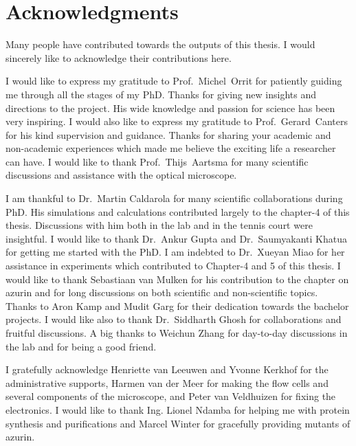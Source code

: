 \chapter*{Acknowledgments}
\label{ch:Acknowledgments}

Many people have contributed towards the outputs of this thesis.
I would sincerely like to acknowledge their contributions here.

I would like to express my gratitude to Prof.~Michel~Orrit for patiently guiding me through all the stages of my PhD.
Thanks for giving new insights and directions to the project.
His wide knowledge and passion for science has been very inspiring.
I would also like to express my gratitude to Prof.~Gerard~Canters for his kind supervision and guidance.
Thanks for sharing your academic and non-academic experiences which made me believe the exciting life a researcher can have.
I would like to thank Prof.~Thijs~Aartsma for many scientific discussions and assistance with the optical microscope.

I am thankful to Dr.~Martin Caldarola for many scientific collaborations during PhD.
His simulations and calculations contributed largely to the chapter-4 of this thesis.
Discussions with him both in the lab and in the tennis court were insightful.
I would like to thank Dr.~Ankur Gupta and Dr.~Saumyakanti Khatua for getting me started with the PhD.
I am indebted to Dr.~Xueyan Miao for her assistance in experiments which contributed to Chapter-4 and 5 of this thesis.
I would like to thank Sebastiaan van Mulken for his contribution to the chapter on azurin and for long discussions on both scientific and non-scientific topics.
Thanks to Aron Kamp and Mudit Garg for their dedication towards the bachelor projects.
I would like also to thank Dr.~Siddharth Ghosh for collaborations and fruitful discussions.
A big thanks to Weichun Zhang for day-to-day discussions in the lab and for being a good friend. 

I gratefully acknowledge Henriette van Leeuwen and Yvonne Kerkhof for the administrative supports, Harmen van der Meer for making the flow cells and several components of the microscope, and Peter van Veldhuizen for fixing the electronics.
I would like to thank Ing. Lionel Ndamba for helping me with protein synthesis and purifications and Marcel Winter for gracefully providing mutants of azurin. 

